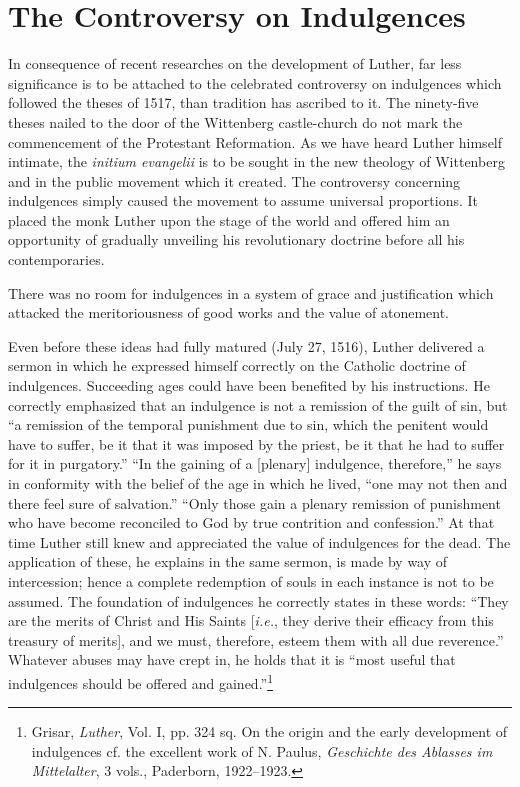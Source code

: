 \section{The Controversy on Indulgences}

In consequence of recent researches on the development of Luther,
far less significance is to be attached to the celebrated controversy
on indulgences which followed the theses of 1517, than tradition
has ascribed to it. The ninety-five theses nailed to the door of the
Wittenberg castle-church do not mark the commencement of the
Protestant Reformation. As we have heard Luther himself intimate,
the \textit{initium evangelii} is to be sought in the new theology of Wittenberg
and in the public movement which it created. The controversy
concerning indulgences simply caused the movement to assume universal proportions.
It placed the monk Luther upon the stage of
the world and offered him an opportunity of gradually unveiling
his revolutionary doctrine before all his contemporaries.

There was no room for indulgences in a system of grace and
justification which attacked the meritoriousness of good works and
the value of atonement.

Even before these ideas had fully matured (July 27, 1516), Luther
delivered a sermon in which he expressed himself correctly on the
Catholic doctrine of indulgences. Succeeding ages could have been
benefited by his instructions. He correctly emphasized that an indulgence
is not a remission of the guilt of sin, but “a remission of
the temporal punishment due to sin, which the penitent would have
to suffer, be it that it was imposed by the priest, be it that he had
to suffer for it in purgatory.” “In the gaining of a [plenary] indulgence,
therefore,” he says in conformity with the belief of the
age in which he lived, “one may not then and there feel sure of
salvation.” “Only those gain a plenary remission of punishment who
have become reconciled to God by true contrition and confession.”
At that time Luther still knew and appreciated the value of indulgences
for the dead. The application of these, he explains in the same
sermon, is made by way of intercession; hence a complete redemption of
souls in each instance is not to be assumed. The foundation
of indulgences he correctly states in these words: “They are the
merits of Christ and His Saints [\textit{i.e.}, they derive their efficacy from
this treasury of merits], and we must, therefore, esteem them with
all due reverence.” Whatever abuses may have crept in, he holds
that it is “most useful that indulgences should be offered and
gained.”\footnote
{Grisar, \textit{Luther}, Vol. I, pp. 324 sq. On the origin and the early development of indulgences
cf. the excellent work of N. Paulus, \textit{Geschichte des Ablasses im Mittelalter}, 3 vols.,
Paderborn, 1922--1923.}

